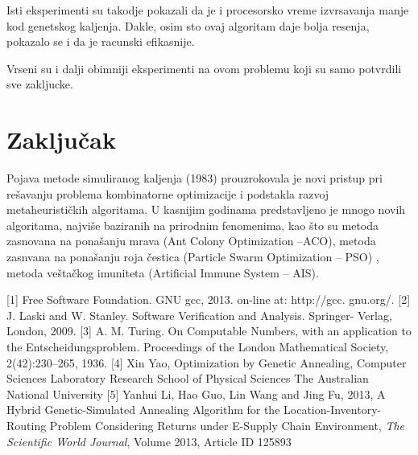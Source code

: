 \documentclass[a4paper]{article}
\begin{document}
Isti eksperimenti su takodje pokazali da je i procesorsko vreme izvrsavanja manje kod genetskog kaljenja. Dakle, osim sto ovaj algoritam daje bolja resenja, pokazalo se i da je racunski efikasnije. \par Vrseni su i dalji obimniji eksperimenti na ovom problemu koji su samo potvrdili sve zakljucke.


\section{Zaključak}
\label{sec:zakljucak}

Pojava metode simuliranog kaljenja (1983) prouzrokovala je novi pristup pri rešavanju
problema kombinatorne optimizacije i podstakla razvoj metaheurističkih algoritama. U kasnijim godinama predstavljeno je mnogo novih algoritama, najviše baziranih na prirodnim
fenomenima, kao što su metoda zasnovana na ponašanju mrava (Ant Colony Optimization –ACO), metoda zasnvana na ponašanju roja čestica (Particle Swarm Optimization –
PSO) , metoda veštačkog imuniteta (Artificial Immune System – AIS).

\newpage
{}

\appendix

 



[1] Free Software Foundation. GNU gcc, 2013. on-line at: http://gcc.
gnu.org/.
[2] J. Laski and W. Stanley. Software Verification and Analysis. Springer-
Verlag, London, 2009.
[3] A. M. Turing. On Computable Numbers, with an application to the
Entscheidungsproblem. Proceedings of the London Mathematical Society,
2(42):230–265, 1936.
[4] Xin Yao, Optimization by Genetic Annealing, Computer Sciences Laboratory
Research School of Physical Sciences
The Australian National University
[5] Yanhui Li, Hao Guo, Lin Wang and Jing Fu, 2013, A Hybrid Genetic-Simulated Annealing Algorithm for the Location-Inventory-Routing Problem Considering Returns under E-Supply Chain Environment, \textit{The Scientific World Journal}, Volume 2013, Article ID 125893
\end{document}
